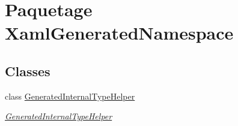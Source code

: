 \hypertarget{namespace_xaml_generated_namespace}{\section{Paquetage Xaml\+Generated\+Namespace}
\label{namespace_xaml_generated_namespace}
}
\subsection*{Classes}
\begin{DoxyCompactItemize}
\item 
class \hyperlink{class_xaml_generated_namespace_1_1_generated_internal_type_helper}{Generated\+Internal\+Type\+Helper}
\begin{DoxyCompactList}\small\item\em \hyperlink{class_xaml_generated_namespace_1_1_generated_internal_type_helper}{Generated\+Internal\+Type\+Helper} \end{DoxyCompactList}\end{DoxyCompactItemize}
